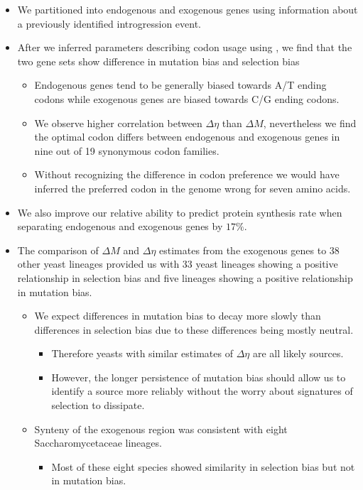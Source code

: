 \documentclass[12pt]{article}
\begin{document}
\begin{itemize}
	\item We partitioned \kluyveri into endogenous and exogenous genes using information about a previously identified introgression event.
	\item After we inferred parameters describing codon usage using \ROC, we find that the two gene sets show difference in mutation bias and selection bias
	\begin{itemize}
	\item Endogenous genes tend to be generally  biased towards A/T ending codons while exogenous genes are biased towards C/G ending codons.
	\item We observe higher correlation between $\Delta \eta$ than $\Delta M$, nevertheless we find the optimal codon differs between endogenous and exogenous genes in nine out of 19 synonymous codon families. 
	\item Without recognizing the difference in codon preference we would have inferred the preferred codon in the \kluyveri genome wrong for seven amino acids.
	\end{itemize}
	\item We also improve our relative ability to predict protein synthesis rate when separating endogenous and exogenous genes by $17 \%$. 
	\item The comparison of $\Delta M$ and $\Delta \eta$ estimates from the exogenous genes to 38 other yeast lineages provided us with 33 yeast lineages showing a positive relationship in selection bias and five lineages showing a positive relationship in mutation bias.
	\begin{itemize}
		\item We expect differences in mutation bias to decay more slowly than differences in selection bias due to these differences being mostly neutral.
		\begin{itemize}
			\item Therefore yeasts with similar estimates of $\Delta \eta$ are all likely sources.
			\item However, the longer persistence of mutation bias should allow us to identify a source more reliably without the worry about signatures of selection to dissipate. 
		\end{itemize}
		\item Synteny of the exogenous region was consistent with eight Saccharomycetaceae lineages.
		\begin{itemize}
			\item Most of these eight species showed similarity in selection bias but not in mutation bias.	

\end{itemize}
\end{itemize}
\end{itemize}
\end{document}
